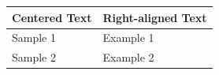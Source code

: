 \documentclass{article}
\begin{document}
\begin{tabular}{|>{\centering\arraybackslash}p{3cm}|>{\raggedleft\arraybackslash}p{3cm}|}
  \hline
  Centered Text & Right-aligned Text \\
  \hline
  Sample 1 & Example 1 \\
  Sample 2 & Example 2 \\
  \hline
\end{tabular}
\end{document}
